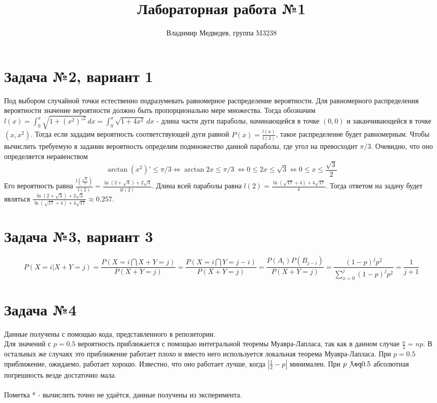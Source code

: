 \documentclass{article}
\title{Лабораторная работа №1}
\author{Владимир Медведев, группа M3238}
\date{}
\begin{document}
\maketitle
\section*{Задача №2, вариант 1}
Под выбором случайной точки естественно подразумевать равномерное распределение вероятности. Для равномерного распределения вероятности значение вероятности должно быть пропорционально мере множества. Тогда обозначим \\
$ l(x) = \int_{0}^{x} \sqrt{1 + (x^2)'^2}\,dx = \int_{0}^{x} \sqrt{1 + 4x^2} \,dx$ - длина части дуги параболы, начинающейся в точке $\left(0, 0\right)$ и заканчивающейся в точке $\left(x, x^2\right)$. Тогда если зададим вероятность соответствующей дуги равной $P(x) = \frac{l(x)}{l(2)}$, такое распределение будет равномерным. Чтобы вычислить требуемую в задании вероятность определим подмножество данной параболы, где угол на превосходит $\pi / 3$. Очевидно, что оно определяется неравенством
\[\arctan{(x^2)'} \le \pi / 3 \iff \arctan{2x} \le \pi / 3 \ \iff 0 \le 2x \le \sqrt{3} \iff 0 \le x \le \frac{\sqrt{3}}{2}\]
Его вероятность равна $\frac{l(\frac{\sqrt{3}}{2})}{l(2)} = \frac{\ln{(2 + \sqrt{3})} + 2\sqrt{3}}{4l(2)}$. Длина всей параболы равна $l(2) = \frac{\ln{(\sqrt{17} + 4)} + 4\sqrt{17}}{4}$. Тогда ответом на задачу будет являться $\frac{\ln{(2 + \sqrt{3})} + 2\sqrt{3}}{\ln{(\sqrt{17} + 4)} + 4\sqrt{17}} \approx 0.257$.

\section*{Задача №3, вариант 3}
\[P(X = i|X + Y = j) = \frac{P(X = i \bigcap X + Y = j)}{P(X + Y = j)} = \frac{P(X = i \bigcap Y = j - i)}{P(X + Y = j)} = \frac{P(A_i) P(B_{j - i})}{P(X + Y = j)} = \frac{(1 - p) ^ j p ^ 2}{\sum_{x = 0}^{j}{(1 - p) ^ j p ^ 2}} = \frac{1}{j + 1}\]

\section*{Задача №4}

Данные получены с помощью кода, представленного в репозитории. \\
Для значений с $p = 0.5$ вероятность приближается с помощью интегральной теоремы Муавра-Лапласа, так как в данном случае $\frac{n}{2} = np$. В остальных же случаях это приближение работает плохо и вместо него используется локальная теорема Муавра-Лапласа. При $p = 0.5$ приближение, ожидаемо, работает хорошо. Известно, что оно работает лучше, когда $|\frac{1}{2} - p|$ минимален. При $p \not \eq 0.5$ абсолютная погрешность везде достаточно мала.\\\\
Пометка * - вычислить точно не удаётся, данные получены из эксперимента.
\end{document}
